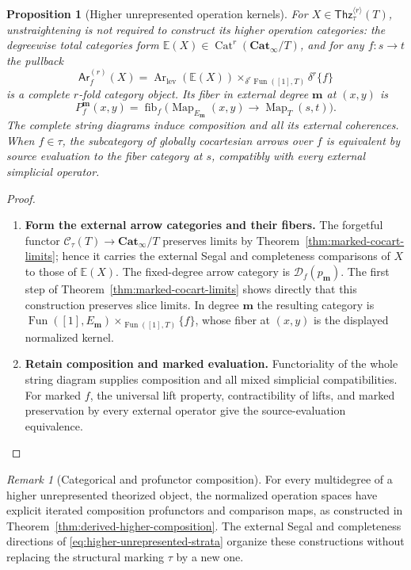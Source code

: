 \documentclass[oneside]{article}
\theoremstyle{plain}
\newtheorem{proposition}[theorem]{Proposition}
\theoremstyle{definition}
\theoremstyle{remark}
\newtheorem{remark}[theorem]{Remark}
\newcommand{\Cat}{\mathbf{Cat}_{\infty}}
\newcommand{\Fun}{\operatorname{Fun}}
\newcommand{\Map}{\operatorname{Map}}
\newcommand{\fib}{\operatorname{fib}}
\begin{document}
\begin{proposition}[Higher unrepresented operation kernels]
\label{prop:higher-unrepresented-kernels}
For $X\in\mathsf{Thz}^{\langle r\rangle}_\tau(T)$, unstraightening
is not required to construct its higher operation categories: the
degreewise total categories form
$\mathbb E(X)\in\operatorname{Cat}^r(\Cat/T)$, and for any
$f:s\to t$ the pullback
\[
 \mathsf{Ar}^{(r)}_f(X)=
 \operatorname{Ar}_{\mathrm{lev}}(\mathbb E(X))
 \times_{\delta^r\Fun([1],T)}\delta^r\{f\}
\]
is a complete $r$-fold category object. Its fiber in external degree
$\mathbf m$ at $(x,y)$ is
\[
 P_f^{\mathbf m}(x,y)
 =\fib_f\bigl(\Map_{E_{\mathbf m}}(x,y)
 \longrightarrow\Map_T(s,t)\bigr).
\]
The complete string diagrams induce composition and all its external
coherences. When $f\in\tau$, the subcategory of globally cocartesian
arrows over $f$ is equivalent by source evaluation to the fiber
category at $s$, compatibly with every external simplicial operator.
\end{proposition}
\begin{proof}
\leavevmode
\begin{enumerate}
\item \textbf{Form the external arrow categories and their fibers.}
The forgetful functor $\mathscr C_\tau(T)\to\Cat/T$
preserves limits by Theorem~\ref{thm:marked-cocart-limits}; hence it
carries the external Segal and completeness comparisons of $X$ to
those of $\mathbb E(X)$. The fixed-degree arrow category is $\mathcal D_f(p_{\mathbf m})$.
The first step of Theorem~\ref{thm:marked-cocart-limits} shows directly
that this construction preserves slice limits.
In degree $\mathbf m$ the resulting category is
$\Fun([1],E_{\mathbf m})\times_{\Fun([1],T)}\{f\}$, whose
fiber at $(x,y)$ is the displayed normalized kernel. 
\item \textbf{Retain composition and marked evaluation.}
Functoriality
of the whole string diagram supplies composition and all mixed
simplicial compatibilities. For marked $f$, the universal lift
property, contractibility of lifts, and marked preservation by every
external operator give the source-evaluation equivalence.
\qedhere
\end{enumerate}
\end{proof}

\begin{remark}[Categorical and profunctor composition]
\label{rem:higher-bimodule-boundary}
For every multidegree of a higher unrepresented theorized object, the
normalized operation spaces have explicit iterated composition
profunctors and comparison maps, as constructed in
Theorem~\ref{thm:derived-higher-composition}. The external Segal and
completeness directions of
\eqref{eq:higher-unrepresented-strata} organize these constructions
without replacing the structural marking $\tau$ by a new one.
\end{remark}
\end{document}
